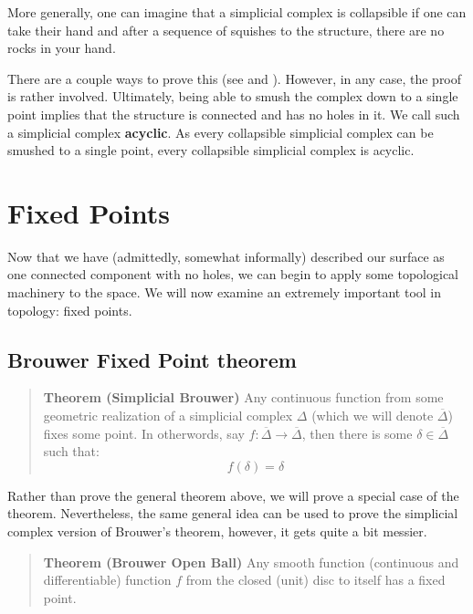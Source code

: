 \documentclass[a4paper]{article}
\newcommand{\ol}{\overline}
\begin{document}
More generally, one can imagine that a simplicial complex is collapsible if one can take their hand and after a sequence of squishes to the structure, there are no rocks in your hand.

There are a couple ways to prove this (see \cite{easy} and \cite{lecs}). However, in any case, the proof is rather involved. Ultimately, being able to smush the complex down to a single point implies that the structure is connected and has no holes in it. We call such a simplicial complex \textbf{acyclic}. As every collapsible simplicial complex can be smushed to a single point, every collapsible simplicial complex is acyclic.

\section{Fixed Points}

Now that we have (admittedly, somewhat informally) described our surface as one connected component with no holes, we can begin to apply some topological machinery to the space. We will now examine an extremely important tool in topology: fixed points.

\subsection{Brouwer Fixed Point theorem}

\begin{quote}
    \textbf{Theorem (Simplicial Brouwer)} Any continuous function from some geometric realization of a simplicial complex $\Delta$ (which we will denote $\ol{\Delta}$) fixes some point. In otherwords, say $f : \ol{\Delta} \to \ol{\Delta}$, then there is some $\delta \in \ol{\Delta}$ such that:
    $$f(\delta) = \delta$$
\end{quote}

Rather than prove the general theorem above, we will prove a special case of the theorem. Nevertheless, the same general idea can be used to prove the simplicial complex version of Brouwer's theorem, however, it gets quite a bit messier.

\begin{quote}
    \textbf{Theorem (Brouwer Open Ball)} Any smooth function (continuous and differentiable) function $f$ from the closed (unit) disc to itself has a fixed point.
\end{quote}
\end{document}
